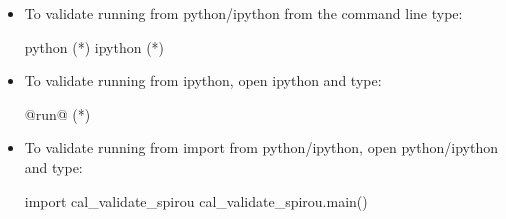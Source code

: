 \begin{itemize}
\item To validate running from python/ipython from the command line type:
\begin{cmdbox}
python (*\calvalidate*)
ipython (*\calvalidate*)
\end{cmdbox}

\item To validate running from ipython, open ipython and type:
\begin{pythonbox}
@run@ (*\calvalidate*)
\end{pythonbox}

\item To validate running from import from python/ipython, open python/ipython and type:
\begin{pythonbox}
import cal_validate_spirou
cal_validate_spirou.main()
\end{pythonbox}

\end{itemize}

